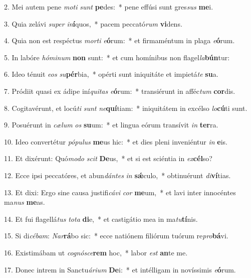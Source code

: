 2. Mei autem pene \textit{mo}\textit{ti} \textit{sunt} \textbf{pe}des:~*  pene effúsi sunt gres\textit{sus} \textbf{me}i.\

3. Quia zelávi \textit{su}\textit{per} \textit{in}\textbf{í}quos,~*  pacem peccató\textit{rum} \textbf{vi}dens.\

4. Quia non est respéctus \textit{mor}\textit{ti} \textit{e}\textbf{ó}rum:~*  et firmaméntum in plaga \textit{e}\textbf{ó}rum.\

5. In labóre \textit{hó}\textit{mi}\textit{num} \textbf{non} sunt:~*  et cum homínibus non flagel\textit{la}\textbf{bún}tur:\

6. Ideo ténuit \textit{e}\textit{os} \textit{su}\textbf{pér}bia,~*  opérti sunt iniquitáte et impietá\textit{te} \textbf{su}a.\

7. Pródiit quasi ex ádipe iní\textit{qui}\textit{tas} \textit{e}\textbf{ó}rum:~*  transiérunt in afféc\textit{tum} \textbf{cor}dis.\

8. Cogitavérunt, et locú\textit{ti} \textit{sunt} \textit{ne}\textbf{quí}tiam:~*  iniquitátem in excélso \textit{lo}\textbf{cú}ti sunt.\

9. Posuérunt in \textit{cæ}\textit{lum} \textit{os} \textbf{su}um:~*  et lingua eórum transívit \textit{in} \textbf{ter}ra.\

10. Ideo convertétur \textit{pó}\textit{pu}\textit{lus} \textbf{me}us hic:~*  et dies pleni inveniéntur \textit{in} \textbf{e}is.\

11. Et dixérunt: Quó\textit{mo}\textit{do} \textit{scit} \textbf{De}us,~*  et si est sciéntia in \textit{ex}\textbf{cél}so?\

12. Ecce ipsi peccatóres, et abun\textit{dán}\textit{tes} \textit{in} \textbf{sǽ}culo,~*  obtinuérunt \textit{di}\textbf{ví}tias.\

13. Et dixi: Ergo sine causa justifi\textit{cá}\textit{vi} \textit{cor} \textbf{me}um,~*  et lavi inter innocéntes ma\textit{nus} \textbf{me}as.\

14. Et fui flagellá\textit{tus} \textit{to}\textit{ta} \textbf{di}e,~*  et castigátio mea in ma\textit{tu}\textbf{tí}nis.\

15. Si di\textit{cé}\textit{bam}: \textit{Nar}\textbf{rá}bo sic:~*  ecce natiónem filiórum tuórum re\textit{pro}\textbf{bá}vi.\

16. Existimábam ut \textit{co}\textit{gnó}\textit{sce}\textbf{rem} hoc,~*  labor \textit{est} \textbf{an}te me.\

17. Donec intrem in Sanctu\textit{á}\textit{ri}\textit{um} \textbf{De}i:~*  et intélligam in novíssimis \textit{e}\textbf{ó}rum.\

